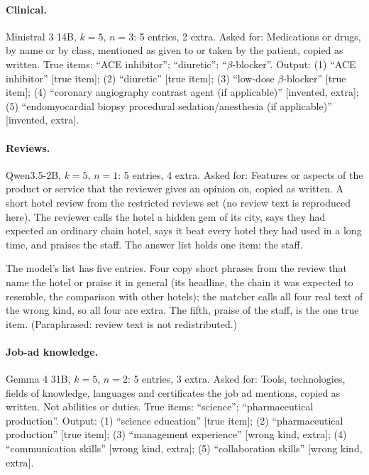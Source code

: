 \paragraph{Clinical.} Ministral 3 14B, $k = 5$, $n = 3$: 5 entries, 2 extra.
Asked for: Medications or drugs, by name or by class, mentioned as given to or taken by the patient, copied as written.
True items: ``ACE inhibitor''; ``diuretic''; ``$\beta$-blocker''.
Output: (1) ``ACE inhibitor'' [true item]; (2) ``diuretic'' [true item]; (3) ``low-dose $\beta$-blocker'' [true item]; (4) ``coronary angiography contrast agent (if applicable)'' [invented, extra]; (5) ``endomyocardial biopsy procedural sedation/anesthesia (if applicable)'' [invented, extra].

\paragraph{Reviews.} Qwen3.5-2B, $k = 5$, $n = 1$: 5 entries, 4 extra.
Asked for: Features or aspects of the product or service that the reviewer gives an opinion on, copied as written.
A short hotel review from the restricted reviews set (no review text is reproduced here). The reviewer calls the hotel a hidden gem of its city, says they had expected an ordinary chain hotel, says it beat every hotel they had used in a long time, and praises the staff. The answer list holds one item: the staff.

The model's list has five entries. Four copy short phrases from the review that name the hotel or praise it in general (its headline, the chain it was expected to resemble, the comparison with other hotels); the matcher calls all four real text of the wrong kind, so all four are extra. The fifth, praise of the staff, is the one true item. (Paraphrased: review text is not redistributed.)

\paragraph{Job-ad knowledge.} Gemma 4 31B, $k = 5$, $n = 2$: 5 entries, 3 extra.
Asked for: Tools, technologies, fields of knowledge, languages and certificates the job ad mentions, copied as written. Not abilities or duties.
True items: ``science''; ``pharmaceutical production''.
Output: (1) ``science education'' [true item]; (2) ``pharmaceutical production'' [true item]; (3) ``management experience'' [wrong kind, extra]; (4) ``communication skills'' [wrong kind, extra]; (5) ``collaboration skills'' [wrong kind, extra].

